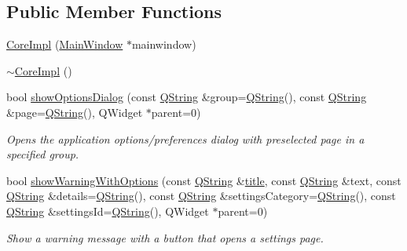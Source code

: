 \subsection*{Public Member Functions}
\begin{DoxyCompactItemize}
\item 
\hyperlink{group___core_plugin_ga61de81df9e02a1a837a850de7d57a95c}{Core\-Impl} (\hyperlink{class_core_1_1_internal_1_1_main_window}{Main\-Window} $\ast$mainwindow)
\item 
\hyperlink{group___core_plugin_ga192f224c86f0b56e729b841c8f549315}{$\sim$\-Core\-Impl} ()
\item 
bool \hyperlink{group___core_plugin_ga856c862f133ac660cc507aa15973d6a9}{show\-Options\-Dialog} (const \hyperlink{group___u_a_v_objects_plugin_gab9d252f49c333c94a72f97ce3105a32d}{Q\-String} \&group=\hyperlink{group___u_a_v_objects_plugin_gab9d252f49c333c94a72f97ce3105a32d}{Q\-String}(), const \hyperlink{group___u_a_v_objects_plugin_gab9d252f49c333c94a72f97ce3105a32d}{Q\-String} \&page=\hyperlink{group___u_a_v_objects_plugin_gab9d252f49c333c94a72f97ce3105a32d}{Q\-String}(), Q\-Widget $\ast$parent=0)
\begin{DoxyCompactList}\small\item\em Opens the application options/preferences dialog with preselected {\itshape page} in a specified {\itshape group}. \end{DoxyCompactList}\item 
bool \hyperlink{group___core_plugin_ga283d2fe1d641e7497d3b6b7bd306fd3f}{show\-Warning\-With\-Options} (const \hyperlink{group___u_a_v_objects_plugin_gab9d252f49c333c94a72f97ce3105a32d}{Q\-String} \&\hyperlink{_parse_e_k_f_log_8m_a5df555a5fed35967e041e4abd1269b4e}{title}, const \hyperlink{group___u_a_v_objects_plugin_gab9d252f49c333c94a72f97ce3105a32d}{Q\-String} \&text, const \hyperlink{group___u_a_v_objects_plugin_gab9d252f49c333c94a72f97ce3105a32d}{Q\-String} \&details=\hyperlink{group___u_a_v_objects_plugin_gab9d252f49c333c94a72f97ce3105a32d}{Q\-String}(), const \hyperlink{group___u_a_v_objects_plugin_gab9d252f49c333c94a72f97ce3105a32d}{Q\-String} \&settings\-Category=\hyperlink{group___u_a_v_objects_plugin_gab9d252f49c333c94a72f97ce3105a32d}{Q\-String}(), const \hyperlink{group___u_a_v_objects_plugin_gab9d252f49c333c94a72f97ce3105a32d}{Q\-String} \&settings\-Id=\hyperlink{group___u_a_v_objects_plugin_gab9d252f49c333c94a72f97ce3105a32d}{Q\-String}(), Q\-Widget $\ast$parent=0)
\begin{DoxyCompactList}\small\item\em Show a warning message with a button that opens a settings page. \end{DoxyCompactList}\item 

\end{DoxyCompactItemize}
